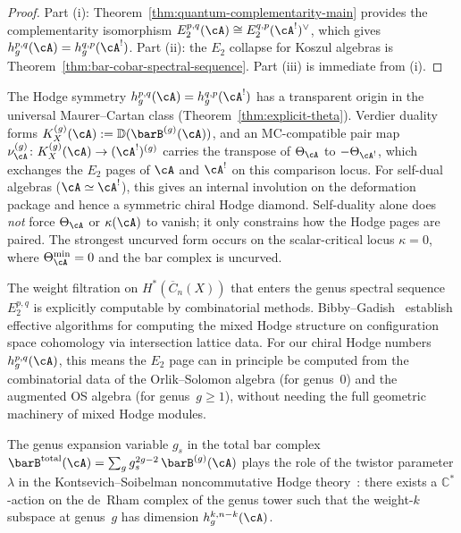 \begin{proof}
Part (i): Theorem~\ref{thm:quantum-complementarity-main}
provides the complementarity isomorphism
$E_2^{p,q}(\cA) \cong E_2^{q,p}(\cA^!)^\vee$, which gives
$h^{p,q}_g(\cA) = h^{q,p}_g(\cA^!)$. Part (ii): the $E_2$
collapse for Koszul algebras is
Theorem~\ref{thm:bar-cobar-spectral-sequence}. Part (iii)
is immediate from (i).
\end{proof}

\begin{remark}
\label{rem:hodge-theta}
The Hodge symmetry $h^{p,q}_g(\cA) = h^{q,p}_g(\cA^!)$
has a transparent origin in the universal Maurer--Cartan
class (Theorem~\ref{thm:explicit-theta}).  Verdier duality forms
$K_X^{(g)}(\cA):=\mathbb D(\barB^{(g)}(\cA))$, and an MC-compatible
pair map $\nu_\cA^{(g)}\colon K_X^{(g)}(\cA)\to(\cA^!)^{(g)}$
carries the transpose of $\Theta_\cA$ to $-\Theta_{\cA^!}$, which
exchanges the $E_2$ pages of $\cA$ and $\cA^!$
on this comparison locus.
For self-dual algebras ($\cA \simeq \cA^!$), this gives an internal
involution on the deformation package and hence a symmetric chiral
Hodge diamond. Self-duality alone does \emph{not} force
$\Theta_\cA$ or $\kappa(\cA)$ to vanish; it only constrains how the
Hodge pages are paired. The strongest uncurved form occurs on the
scalar-critical locus $\kappa = 0$, where
$\Theta_\cA^{\min} = 0$ and the bar complex is uncurved.
\end{remark}

\begin{remark}\label{rem:weight-filtration-computable}
The weight filtration on $H^*(\overline{C}_n(X))$ that enters the genus spectral sequence $E_2^{p,q}$ is explicitly computable by combinatorial methods. Bibby--Gadish~\cite{BG24} establish effective algorithms for computing the mixed Hodge structure on configuration space cohomology via intersection lattice data. For our chiral Hodge numbers $h^{p,q}_g(\cA)$, this means the $E_2$ page can in principle be computed from the combinatorial data of the Orlik--Solomon algebra (for genus~$0$) and the augmented OS algebra (for genus~$g \geq 1$), without needing the full geometric machinery of mixed Hodge modules.
\end{remark}

\begin{conjecture}\label{conj:nc-hodge}
The genus expansion variable $g_s$ in the total bar complex
$\barB^{\mathrm{total}}(\cA) = \sum_g g_s^{2g-2}\, \barB^{(g)}(\cA)$
plays the role of the twistor parameter $\lambda$ in the
Kontsevich--Soibelman noncommutative Hodge
theory~\cite{KontsevichSoibelman}: there exists a
$\mathbb{C}^*$-action on the de~Rham complex of the genus tower
such that the weight-$k$ subspace at genus~$g$ has dimension
$h^{k,n-k}_g(\cA)$.
\end{conjecture}

